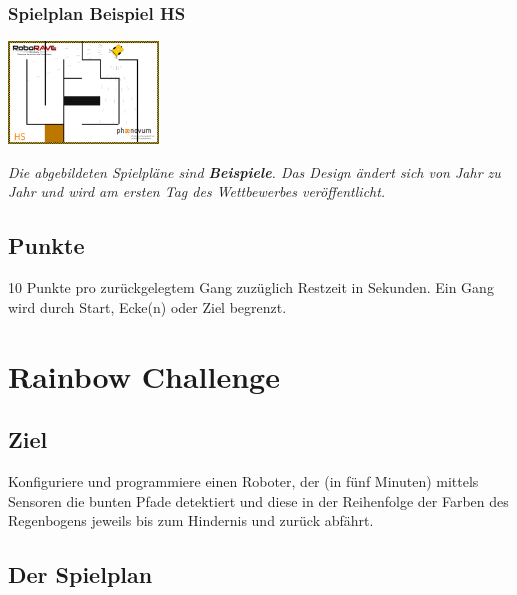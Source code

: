 \documentclass[a4paper,12pt]{article}
\begin{document}
\subsubsection{Spielplan Beispiel HS}
\includegraphics[width=0.3\textwidth]{images/cyberspace/labyrinth_hs.png}

\emph{Die abgebildeten Spielpläne sind \textbf{Beispiele}. Das Design ändert sich von Jahr zu
Jahr und wird am ersten Tag des Wettbewerbes veröffentlicht.}

\subsection{Punkte}

10 Punkte pro zurückgelegtem Gang zuzüglich Restzeit in Sekunden.
Ein Gang wird durch Start, Ecke(n) oder Ziel begrenzt.

\section{Rainbow Challenge}

\subsection{Ziel}

Konfiguriere und programmiere einen Roboter, der (in fünf Minuten) mittels
Sensoren die bunten Pfade detektiert und diese in der Reihenfolge der Farben
des Regenbogens jeweils bis zum Hindernis und zurück abfährt.

\subsection{Der Spielplan}
\end{document}
